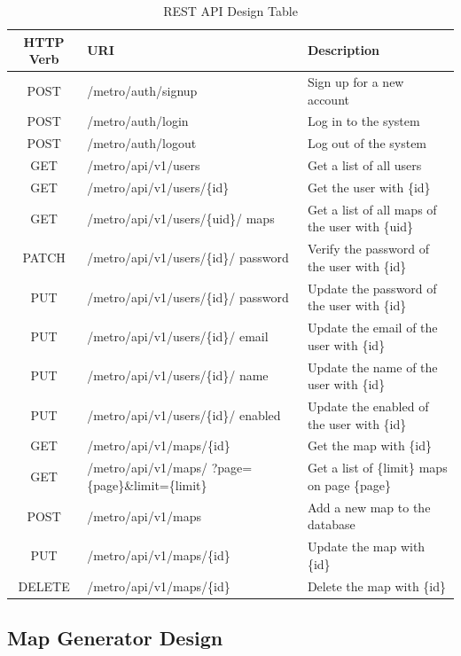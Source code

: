 \begin{table}[ht]
  \centering
  \begin{tabularx}{\textwidth}{>{\raggedright}cXX} %
    \toprule[1.5pt]
    \textbf{HTTP Verb} & \textbf{URI} & \textbf{Description}
    \\ \midrule[1.5pt]
    POST & /metro/auth/signup & Sign up for a new account
    \\ \midrule
    POST & /metro/auth/login & Log in to the system
    \\ \midrule
    POST & /metro/auth/logout & Log out of the system
    \\ \midrule
    GET & /metro/api/v1/users & Get a list of all users
    \\ \midrule
    GET & /metro/api/v1/users/\{id\} & Get the user with \{id\}
    \\ \midrule
    GET & /metro/api/v1/users/\{uid\}/ maps & Get a list of all maps of the user with \{uid\}
    \\ \midrule
    PATCH & /metro/api/v1/users/\{id\}/ password & Verify the password of the user with \{id\}
    \\ \midrule
    PUT & /metro/api/v1/users/\{id\}/ password & Update the password of the user with \{id\}
    \\ \midrule
    PUT & /metro/api/v1/users/\{id\}/ email & Update the email of the user with \{id\} \\ \midrule
    PUT & /metro/api/v1/users/\{id\}/ name & Update the name of the user with \{id\} \\ \midrule
    PUT & /metro/api/v1/users/\{id\}/ enabled & Update the enabled of the user with \{id\}
    \\ \midrule
    GET & /metro/api/v1/maps/\{id\} & Get the map with \{id\}
    \\ \midrule
    GET & /metro/api/v1/maps/ ?page=\{page\}\&limit=\{limit\} & Get a list of \{limit\} maps on page \{page\}
    \\ \midrule
    POST & /metro/api/v1/maps & Add a new map to the database
    \\ \midrule
    PUT & /metro/api/v1/maps/\{id\} & Update the map with \{id\}
    \\ \midrule
    DELETE & /metro/api/v1/maps/\{id\} & Delete the map with \{id\}
    \\ \bottomrule[1.5pt]
  \end{tabularx}
  \caption[REST API Design Table]{REST API Design Table}
  \label{REST API Design Table}
\end{table}

\subsection{Map Generator Design}

